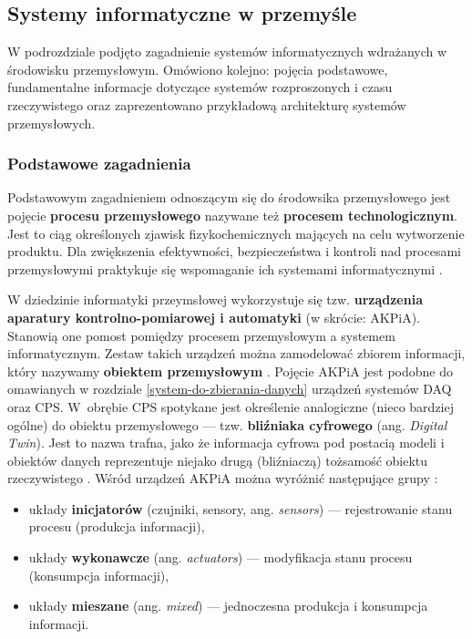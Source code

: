 \documentclass[a4paper, 12pt, twoside]{article}
\begin{document}
\subsection{Systemy informatyczne w przemyśle} \label{isp}

W podrozdziale podjęto zagadnienie systemów informatycznych wdrażanych w środowisku przemysłowym.
Omówiono kolejno: pojęcia podstawowe, fundamentalne informacje dotyczące systemów rozproszonych i czasu rzeczywistego
oraz zaprezentowano przykładową architekturę systemów przemysłowych.

\subsubsection{Podstawowe zagadnienia}

Podstawowym zagadnieniem odnoszącym się do środowsika przemysłowego jest pojęcie
\textbf{procesu przemysłowego} nazywane też \textbf{procesem technologicznym}.
Jest to ciąg określonych zjawisk fizykochemicznych mających na celu wytworzenie
produktu. Dla zwiększenia efektywności, bezpieczeństwa i kontroli nad procesami
przemysłowymi praktykuje się wspomaganie ich systemami informatycznymi \cite{isp}.

W dziedzinie informatyki przeymsłowej wykorzystuje się tzw.
\textbf{urządzenia aparatury kontrolno-pomiarowej i automatyki} (w skrócie: AKPiA).
Stanowią one pomost pomiędzy procesem przemysłowym a systemem informatycznym.
Zestaw takich urządzeń można zamodelować zbiorem informacji, który nazywamy
\textbf{obiektem przemysłowym} \cite{isp}. Pojęcie AKPiA jest podobne do omawianych
w rozdziale \ref{system-do-zbierania-danych} urządzeń systemów DAQ oraz CPS. W~obrębie
CPS spotykane jest określenie analogiczne (nieco bardziej ogólne) do obiektu przemysłowego ---
tzw. \textbf{bliźniaka cyfrowego} (ang. \emph{Digital Twin}).
Jest to nazwa trafna, jako że informacja cyfrowa pod postacią modeli i obiektów
danych reprezentuje niejako drugą (bliźniaczą) tożsamość obiektu rzeczywistego
\cite{iiot-challenges-opportunities-directions}.
Wśród urządzeń AKPiA można wyróżnić następujące grupy \cite{isp}:
\begin{itemize}
    \itemsep0em
    \item układy \textbf{inicjatorów} (czujniki, sensory, ang. \emph{sensors}) --- rejestrowanie stanu procesu (produkcja informacji),
    \item układy \textbf{wykonawcze} (ang. \emph{actuators}) --- modyfikacja stanu procesu (konsumpcja informacji),
    \item układy \textbf{mieszane} (ang. \emph{mixed}) --- jednoczesna produkcja i konsumpcja informacji.
\end{itemize}
\end{document}
